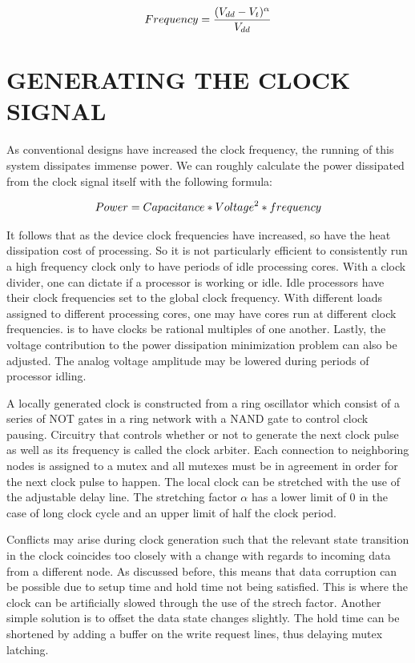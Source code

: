 \documentclass[letterpaper, 10 pt, conference]{ieeeconf}
\begin{document}
\begin{equation}
Frequency = \frac{(V_{dd}-V_t)^{\alpha}}{V_{dd}} \\
\end{equation}

\section{GENERATING THE CLOCK SIGNAL}

As conventional designs have increased the clock frequency, the running of this system dissipates immense power.  We can roughly calculate the power dissipated from the clock signal itself with the following formula:

\begin{equation}
Power = Capacitance * Voltage ^2 * frequency \\
\end{equation}

It follows that as the device clock frequencies have increased, so have the heat dissipation cost of processing.  So it is not particularly efficient to consistently run a high frequency clock only to have periods of idle processing cores.  With a clock divider, one can dictate if a processor is working or idle.  Idle processors have their clock frequencies set to the global clock frequency.  With different loads assigned to different processing cores, one may have cores run at different clock frequencies. is to have clocks be rational multiples of one another.  Lastly, the voltage contribution to the power dissipation minimization problem can also be adjusted.  The analog voltage amplitude may be lowered during  periods of processor idling.


A locally generated clock is constructed from a ring oscillator which consist of a series of NOT gates in a ring network with a NAND gate to control clock pausing.  Circuitry that controls whether or not to generate the next clock pulse as well as its frequency is called the clock arbiter.  Each connection to neighboring nodes is assigned to a mutex and all mutexes must be in agreement in order for the next clock pulse to happen.  The local clock can be stretched with the use of the adjustable delay line.  The stretching factor $\alpha$ has a lower limit of 0 in the case of long clock cycle and an upper limit of half the clock period.

Conflicts may arise during clock generation such that the relevant state transition in the clock coincides too closely with a change with regards to incoming data from a different node.  As discussed before, this means that data corruption can be possible due to setup time and hold time not being satisfied.  This is where the clock can be artificially slowed through the use of the strech factor.  Another simple solution is to offset the data state changes slightly.  The hold time can be shortened by adding a buffer on the write request lines, thus delaying mutex latching.
\end{document}
